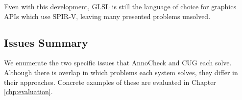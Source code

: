 \documentclass[a4paper,12pt,twoside,openright]{report}
\begin{document}
Even with this development, GLSL is still the language of choice for graphics
APIs which use SPIR-V, leaving many presented problems unsolved.






\subsection{Issues Summary}

\label{sec:issues_summary}

We enumerate the two specific issues that AnnoCheck and CUG each solve.
Although there is overlap in which problems each system solves, they differ in
their approaches. Concrete examples of these are evaluated in Chapter
\ref{chp:evaluation}.
\end{document}
